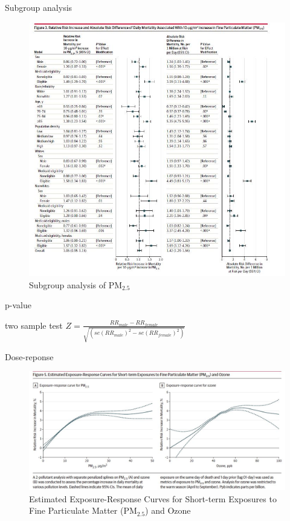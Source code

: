 \documentclass[ignorenonframetext,]{beamer}
\begin{document}
\begin{frame}{Subgroup analysis}

\begin{figure}
\centering
\includegraphics{p6.JPG}
\caption{Subgroup analysis of PM\(_{2.5}\)}
\end{figure}

\end{frame}

\begin{frame}{p-value}

two sample test
\(Z = \frac{RR_{male} - RR_{female}}{\sqrt{(se(RR_{male})^2 - se(RR_{female})^2)}}\)

\end{frame}

\begin{frame}{Dose-reponse}

\begin{figure}
\centering
\includegraphics{p5.JPG}
\caption{Estimated Exposure-Response Curves for Short-term Exposures to
Fine Particulate Matter (PM\(_{2.5}\)) and Ozone}
\end{figure}

\end{frame}
\end{document}
